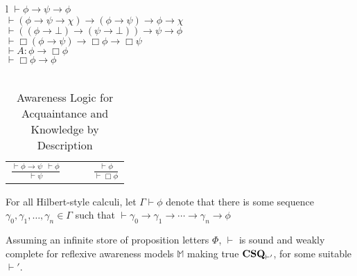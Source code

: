 

\begin{table}[h]
\begin{centering}
  \begin{tabular}{l}
    $\vdash \phi \rightarrow \psi \rightarrow \phi$\\
    $\vdash (\phi \rightarrow \psi \rightarrow \chi) \rightarrow (\phi
    \rightarrow \psi) \rightarrow \phi \rightarrow \chi$\\
    $\vdash ((\phi \rightarrow \bot) \rightarrow (\psi \rightarrow \bot))
    \rightarrow \psi \rightarrow \phi$\\
    $\vdash \Box(\phi \rightarrow \psi) \rightarrow \Box \phi \rightarrow \Box
    \psi$\\
    $\vdash A : \phi \rightarrow \Box \phi$\\
    $\vdash \Box \phi \rightarrow \phi$\\
    \\
    \begin{tabular}{lll}
      $\displaystyle \frac{\vdash \phi \rightarrow \psi \ \  \vdash \phi}{\vdash
      \psi}$ & {\ \ } & $\displaystyle \frac{\vdash \phi}{\vdash \Box \phi}$
    \end{tabular}
  \end{tabular}
  \caption{\label{logic0}Awareness Logic for Acquaintance and
    Knowledge by Description}
\end{centering}
\end{table}

\begin{notation}
For all Hilbert-style calculi, let $\Gamma \vdash \phi$
denote that there is some sequence
$\gamma_0,\gamma_1,\ldots,\gamma_n\in\Gamma$ such that $\vdash
\gamma_0 \to \gamma_1 \to \cdots \to \gamma_n \to \phi$
\end{notation}

\begin{theorem}
  \label{completeness0}Assuming an infinite store of proposition letters
  $\Phi$, $\vdash$ is sound and weakly complete for
  reflexive awareness models $\mathbb{M}$ making true
  $\text{{\bfseries{CSQ}}}_{\vdash'}$, for some suitable $\vdash'$.
\end{theorem}



